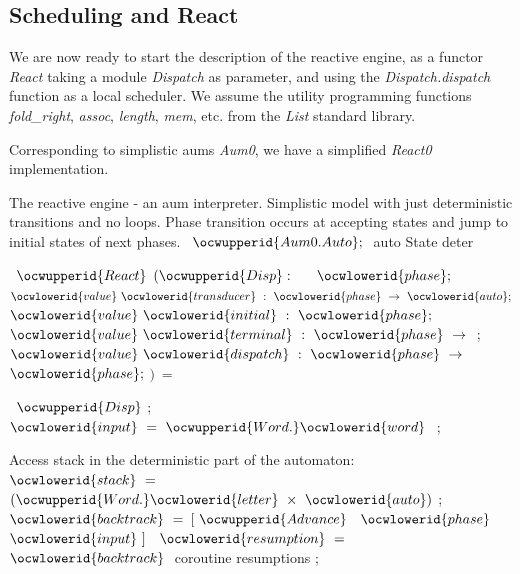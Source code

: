 \documentclass[12pt]{article}
\begin{document}
\subsection{Scheduling and React}

We are now ready to start the description of the reactive engine, as
a functor {\sl React} taking a module {\sl Dispatch} as parameter, and using the
{\sl Dispatch.dispatch} function as a local scheduler. 
We assume the utility programming functions {\sl fold\_right},
{\sl assoc}, {\sl length}, {\sl mem}, etc. from the {\sl List}
standard library.

Corresponding to simplistic aums {\sl Aum0}, we have a simplified {\sl React0}
implementation.

\label{../ML/react0.ml:0}%
The reactive engine - an aum interpreter.
   Simplistic model with just deterministic transitions and no loops. 
   Phase transition occurs at accepting states and jump to initial states 
   of next phases. 
\ocweol
\label{../ML/react0.ml:831}%
\medskip
\ocwbegincode{}\ocwindent{0.00em}
~$\ocwupperid{Aum0.Auto};~$\ocwbc{} auto State deter \ocwec{}\medskip

\label{../ML/react0.ml:871}%
\ocwindent{0.00em}
~$\ocwupperid{React}$\ocweol
\ocwindent{1.00em}
$(\ocwupperid{Disp}:~$~\ocweol
\ocwindent{4.00em}
~$\ocwlowerid{phase};$\ocweol
\ocwindent{4.00em}
$\ocwlowerid{value}~\ocwlowerid{transducer}~:~\ocwlowerid{phase}~\rightarrow{}~\ocwlowerid{auto};$\ocweol
\ocwindent{4.00em}
$\ocwlowerid{value}~\ocwlowerid{initial}~:~\ocwlowerid{phase};$\ocweol
\ocwindent{4.00em}
$\ocwlowerid{value}~\ocwlowerid{terminal}~:~\ocwlowerid{phase}~\rightarrow{}~$;\ocweol
\ocwindent{4.00em}
$\ocwlowerid{value}~\ocwlowerid{dispatch}~:~\ocwlowerid{phase}~\rightarrow{}~$~$\ocwlowerid{phase};$\ocweol
\ocwindent{4.00em}
$)~=~$\medskip

\label{../ML/react0.ml:1100}%
\ocwindent{0.00em}
~$\ocwupperid{Disp}$\ocweol
\ocwindent{0.00em}
;\ocweol
\ocwindent{0.00em}
~$\ocwlowerid{input}~=~\ocwupperid{Word.}\ocwlowerid{word}~$\ocweol
\ocwindent{0.00em}
;\medskip

\ocwendcode{}\ocwindent{0.00em}
Access stack in the deterministic part of the automaton: 
\ocweol
\label{../ML/react0.ml:1202}%
\medskip
\ocwbegincode{}\ocwindent{0.00em}
~$\ocwlowerid{stack}~=~$~$(\ocwupperid{Word.}\ocwlowerid{letter}~\times{}~\ocwlowerid{auto})$\ocweol
\ocwindent{0.00em}
;\ocweol
\ocwindent{0.00em}
~$\ocwlowerid{backtrack}~=$\ocweol
\ocwindent{1.00em}
$[~\ocwupperid{Advance}~$~$\ocwlowerid{phase}~$~$\ocwlowerid{input}~]$\ocweol
\ocwindent{0.00em}
~$\ocwlowerid{resumption}~=~$~$\ocwlowerid{backtrack}~$\ocwbc{} coroutine resumptions \ocwec{}\ocweol
\ocwindent{0.00em}
;\medskip
\end{document}
